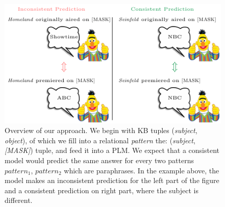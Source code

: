\begin{figure}[t!]
\centering

\includegraphics[width=1.\columnwidth]{figures/overview}

\caption{Overview of our approach. We begin with KB tuples (\textit{subject}, \textit{object}), of which we fill into a relational \textit{pattern} the: (\textit{subject}, \textit{[MASK]}) tuple,
and feed it into a PLM. 
We expect that a consistent model would predict the same answer for every two patterns $pattern_1$, $pattern_2$ which are paraphrases. 
In the example above, the model makes an inconsistent prediction for the left part of the figure and a consistent prediction on right part, where the subject is different.}
\label{fig:overview}
\end{figure}


